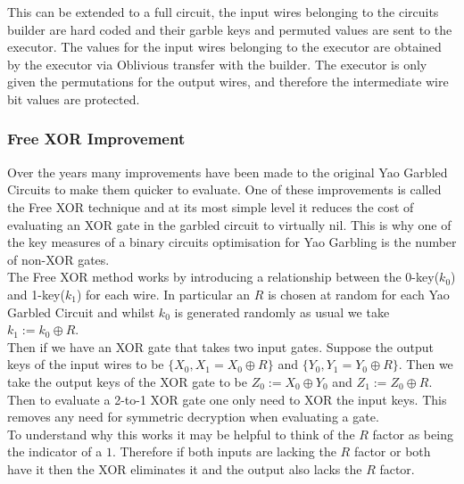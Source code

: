 \documentclass[ %
                    author={Nicholas Tutte},
                supervisor={Prof. Nigel Smart},
                    degree={MEng},
                     title={Secure Two Party Computation},
                  subtitle={A practical comparison of recent protocols},
                      type={Research - GG1K},
                      year={2015} ]{dissertation}
\begin{document}
			This can be extended to a full circuit, the input wires belonging to the circuits builder are hard coded and their garble keys and permuted values are sent to the executor. The values for the input wires belonging to the executor are obtained by the executor via Oblivious transfer with the builder. The executor is only given the permutations for the output wires, and therefore the intermediate wire bit values are protected.

			\subsubsection{Free XOR Improvement}

				Over the years many improvements have been made to the original Yao Garbled Circuits to make them quicker to evaluate. One of these improvements is called the Free XOR technique and at its most simple level it reduces the cost of evaluating an XOR gate in the garbled circuit to virtually nil. This is why one of the key measures of a binary circuits optimisation for Yao Garbling is the number of non-XOR gates.\\

				The Free XOR method works by introducing a relationship between the 0-key($k_0$) and 1-key($k_1$) for each wire. In particular an $R$ is chosen at random for each Yao Garbled Circuit and whilst $k_0$ is generated randomly as usual we take $k_1 := k_0 \oplus R$.\\

				Then if we have an XOR gate that takes two input gates. Suppose the output keys of the input wires to be $\{X_0, X_1 = X_0 \oplus R\}$ and $\{Y_0, Y_1 = Y_0 \oplus R\}$. Then we take the output keys of the XOR gate to be $Z_0 := X_0 \oplus Y_0$ and $Z_1 := Z_0 \oplus R$.\\

				Then to evaluate a 2-to-1 XOR gate one only need to XOR the input keys. This removes any need for symmetric decryption when evaluating a gate.\\

				To understand why this works it may be helpful to think of the $R$ factor as being the indicator of a $1$. Therefore if both inputs are lacking the $R$ factor or both have it then the XOR eliminates it and the output also lacks the $R$ factor.\\
\end{document}
